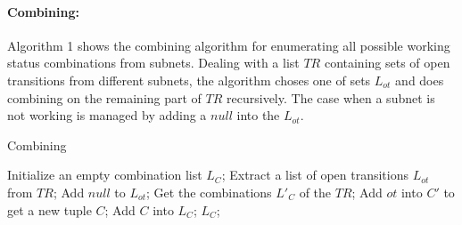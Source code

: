 \documentclass{lncs/llncs}
\begin{document}
%
%

\paragraph{Combining:}
Algorithm 1 shows the combining algorithm for enumerating all possible
working status combinations from subnets. Dealing with a list $TR$
containing  sets of open transitions from different subnets,
the algorithm choses one of sets $L_{ot}$ and does combining on the
remaining part of $TR$ recursively. The case when a subnet is not working is
managed by adding a $null$ into the $L_{ot}$.

\begin{algorithm}
\caption{Combining}
\begin{algorithmic}[1]

\State Initialize an empty combination list $L_C$;
\State Extract a list of open transitions $L_{ot}$ from $TR$;
\State Add $null$ to $L_{ot}$;
\State Get the combinations $L'_C$ of the $TR$;
		\State Add $ot$ into $C'$ to get a new tuple $C$;
		\State Add $C$ into $L_C$;
	\EndFor
\EndFor 
\State \Return $L_C$;

\end{algorithmic}  
\end{algorithm}
\end{document}
